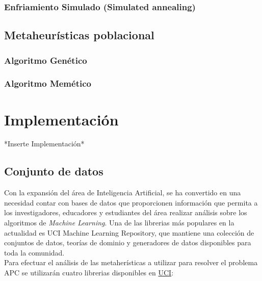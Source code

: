 \documentclass{ci5652}
\begin{document}
\subsubsection{Enfriamiento Simulado (Simulated annealing)}

\subsection{Metaheurísticas poblacional}
\subsubsection{Algoritmo Genético}
\subsubsection{Algoritmo Memético}


\section{Implementación}
*Inserte Implementación*


\subsection{Conjunto de datos}

Con la expansión del área de Inteligencia Artificial, se ha convertido en una
necesidad contar con bases de datos que proporcionen información que permita a
los investigadores, educadores y estudiantes del área realizar análisis sobre 
los algoritmos de \textit{Machine Learning}. Una de las librerias más populares
en la actualidad es UCI Machine Learning Repository, que mantiene una colección
de conjuntos de datos, teorías de dominio y generadores de datos disponibles 
para toda la comunidad.\\

Para efectuar el análisis de las metaherísticas a utilizar para resolver el
problema APC se utilizarán cuatro librerias disponibles en 
\href{http://archive.ics.uci.edu/ml/index.php}{UCI}:
\end{document}
